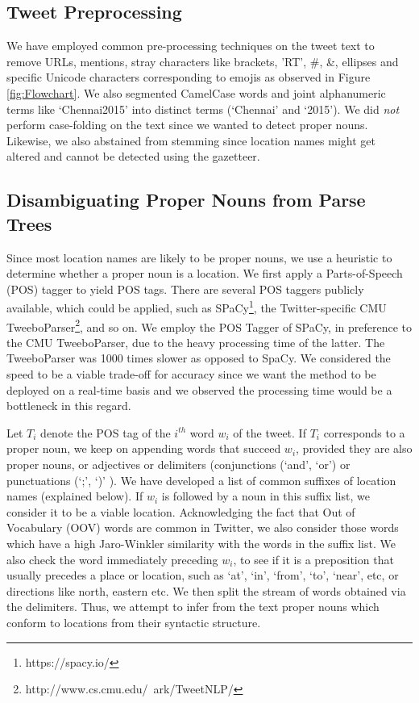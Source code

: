 \subsection{Tweet Preprocessing}

We have employed common pre-processing techniques on the tweet text to remove URLs, mentions, stray characters like brackets, 'RT', \#, \&, ellipses and specific Unicode characters corresponding to emojis as observed in Figure \ref{fig:Flowchart}.
We also segmented CamelCase words and joint alphanumeric terms like `Chennai2015' into distinct terms (`Chennai' and `2015').
We did {\it not} perform case-folding on the text since we wanted to detect proper nouns. Likewise, we also abstained from stemming since location names might get altered and cannot be detected using the gazetteer.


\subsection{Disambiguating Proper Nouns from Parse Trees}

Since most location names are likely to be proper nouns, we use a heuristic to determine whether a proper noun is a location. 
We first apply a Parts-of-Speech (POS) tagger to yield POS tags.
There are several POS taggers publicly available, which could be applied, such as SPaCy\footnote{https://spacy.io/}, the Twitter-specific 
CMU TweeboParser\footnote{http://www.cs.cmu.edu/~ark/TweetNLP/}, and so on.
We employ the POS Tagger of SPaCy, in preference to the CMU TweeboParser, due to the heavy processing time of the latter. The TweeboParser was 1000 times slower as opposed to SpaCy. 
We considered the speed to be a viable trade-off for accuracy since we want the method to be deployed on a real-time basis and we observed the processing time would be a bottleneck in this regard.

Let $T_{i}$ denote the POS tag of the $i^{th}$ word $w_i$ of the tweet. If $T_{i}$ corresponds to a proper noun, we keep on appending words that succeed $w_i$, provided they are also proper nouns, or adjectives or delimiters (conjunctions (`and', `or') or punctuations (`;', `)' ). 
We have developed a list of common suffixes of location names (explained below). 
If $w_i$ is followed by a noun in this suffix list, we consider it to be a viable location. Acknowledging the fact that Out of Vocabulary (OOV) words are common in Twitter, we also consider those words which have a high Jaro-Winkler similarity with the words in the suffix list.
We also check the word immediately preceding $w_i$, to see if it is a preposition that usually precedes a place or location, such as `at', `in', `from', `to', `near', etc, or directions like north, eastern etc.  
We then split the stream of words obtained via the delimiters.
Thus, we attempt to infer from the text proper nouns which conform to locations from their syntactic structure. 

